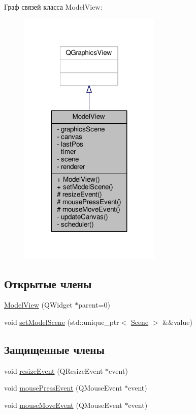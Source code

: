 Граф связей класса Model\+View\+:
\nopagebreak
\begin{figure}[H]
\begin{center}
\leavevmode
\includegraphics[width=191pt]{db/d50/class_model_view__coll__graph}
\end{center}
\end{figure}
\subsection*{Открытые члены}
\begin{DoxyCompactItemize}
\item 
\hyperlink{class_model_view_a77f7dded12c094ecfe844809aba9274e}{Model\+View} (Q\+Widget $\ast$parent=0)
\item 
void \hyperlink{class_model_view_ab2d171869dfb01218eb5c1956bedb1a2}{set\+Model\+Scene} (std\+::unique\+\_\+ptr$<$ \hyperlink{class_scene}{Scene} $>$ \&\&value)
\end{DoxyCompactItemize}
\subsection*{Защищенные члены}
\begin{DoxyCompactItemize}
\item 
void \hyperlink{class_model_view_aadae7104e72e31784ad241b648bd5e73}{resize\+Event} (Q\+Resize\+Event $\ast$event)
\item 
void \hyperlink{class_model_view_acd6c5305eb70b148fac15c7d1eef37df}{mouse\+Press\+Event} (Q\+Mouse\+Event $\ast$event)
\item 
void \hyperlink{class_model_view_aaa864c638d5ce42eebf8c0af6e884ec6}{mouse\+Move\+Event} (Q\+Mouse\+Event $\ast$event)
\end{DoxyCompactItemize}
